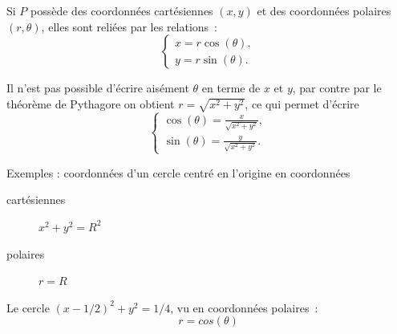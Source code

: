 \begin{frame}
  Si $P$ possède des coordonnées cartésiennes $(x,y)$ et des coordonnées
polaires $(r,\theta)$, elles sont reliées par les relations~:
\begin{equation*}
  \begin{cases}
    x = r \cos (\theta),\\
    y = r \sin (\theta).
  \end{cases}
\end{equation*}
\begin{remark}
  Il n'est pas possible d'écrire aisément $\theta$ en terme de $x$ et
  $y$, par contre par le théorème de Pythagore on obtient $r =
  \sqrt{x^{2}+y^{2}}$, ce qui permet d'écrire
  \begin{equation*}
    \begin{cases}
      \cos(\theta) = \frac{x}{\sqrt {x^{2}+y^{2}}},\\
      \sin(\theta) = \frac{y}{\sqrt {x^{2}+y^{2}}}.
    \end{cases}
  \end{equation*}
\end{remark}
\end{frame}
\begin{frame}
  Exemples : coordonnées d'un cercle centré en l'origine en coordonnées
  \begin{description}
  \item[cartésiennes] \(x^{2} + y^{2} = R^{2}\)
  \item[polaires] \(r = R\)
  \end{description}\pause

  Le cercle \((x-1/2)^{2} + y^{2} = 1/4\), vu en coordonnées polaires~:
  \begin{equation*}
    r = cos(\theta)
  \end{equation*}
\end{frame}

